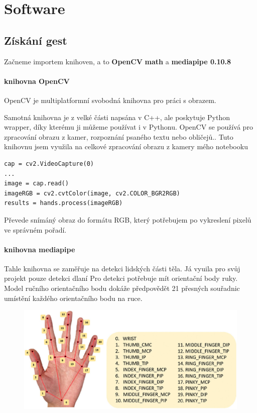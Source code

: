 \documentclass[12pt, a4paper,
twoside,        %
openright
]{report}
\begin{document}
{\newpage




\chapter{Software}

\section{Získání gest}
Začneme importem knihoven, a to \textbf{OpenCV}  \textbf{math} a \textbf{mediapipe 0.10.8}  

\subsubsection{knihovna OpenCV}
OpenCV je multiplatformní svobodná  knihovna pro práci s obrazem.

 Samotná knihovna je z velké části napsána v C++, ale poskytuje Python wrapper, díky kterému ji můžeme používat i v Pythonu. 
 OpenCV se používá pro zpracování obrazu z kamer, rozpoznání psaného textu nebo obličejů..
Tuto knihovnu jsem využila na celkové zpracování obrazu z kamery mého notebooku


\begin{lstlisting}[style=Python, caption={obraz, a jeho převedení do správného formátu}]
cap = cv2.VideoCapture(0)
...
image = cap.read()
imageRGB = cv2.cvtColor(image, cv2.COLOR_BGR2RGB)
results = hands.process(imageRGB)
\end{lstlisting}

Převede snímáný obraz do formátu RGB, který potřebujem po vykreslení pixelů ve správném pořadí.

\subsubsection{knihovna mediapipe}

Tahle knihovna se zaměřuje na detekci lidských části těla.
Já vyuila pro svůj projekt pouze detekci dlaní
Pro detekci potřebuje mít orientační body ruky. Model ručního orientačního bodu dokáže předpovědět 21 přesných souřadnic umístění každého orientačního bodu na ruce.

\begin{figure}[h]
	
	\centering
	\includegraphics[width=0.8\linewidth]{image/orientacniBody.jpg} 
	

\end{figure}}
\end{document}
